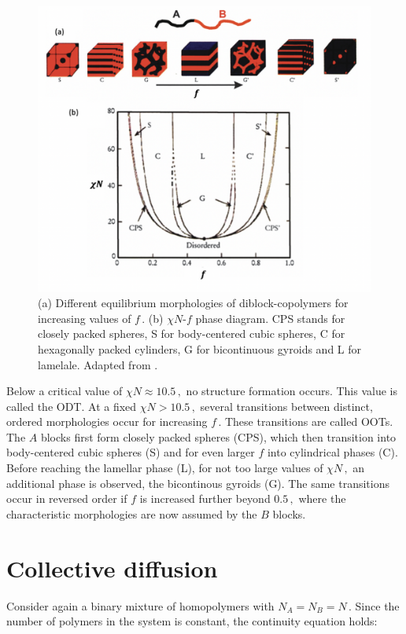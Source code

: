 \documentclass[bachelor,       %
               twoside,        %
               BCOR10mm,       %
               ngerman, english %
               ]{GAUBM}
\begin{document}
\begin{figure}[h]
  \centering
  \includegraphics[width=0.8\linewidth]{figures/diblock_phasediagram.png}
  \caption{(a) Different equilibrium morphologies of diblock-copolymers for increasing values of $f\,.$ (b) $\chi N$-$f$ phase diagram. CPS stands for closely packed spheres, S for body-centered cubic spheres, C for hexagonally packed cylinders, G for bicontinuous gyroids and L for lamelale. Adapted from \cite{Mai_diblock_selfassembly}. }
  \label{fig:diblock_phasediagram}
\end{figure}

Below a critical value of $\chi N\approx 10.5\,,$ no structure formation occurs. This value is called the \ac{ODT}. At a fixed $\chi N> 10.5\,,$ several transitions between distinct, ordered morphologies occur for increasing $f\,.$ These transitions are called \acp{OOT}. The $A$ blocks first form closely packed spheres (CPS), which then transition into body-centered cubic spheres (S) and for even larger $f$ into cylindrical phases (C). Before reaching the lamellar phase (L), for not too large values of $\chi N\,,$ an additional phase is observed, the bicontinous gyroids (G). The same transitions occur in reversed order if $f$ is increased further beyond $0.5\,,$ where the characteristic morphologies are now assumed by the $B$ blocks.

\section{Collective diffusion}

Consider again a binary mixture of homopolymers with $N_A=N_B=N\,$. Since the number of polymers in the system is constant, the continuity equation holds:
\end{document}
